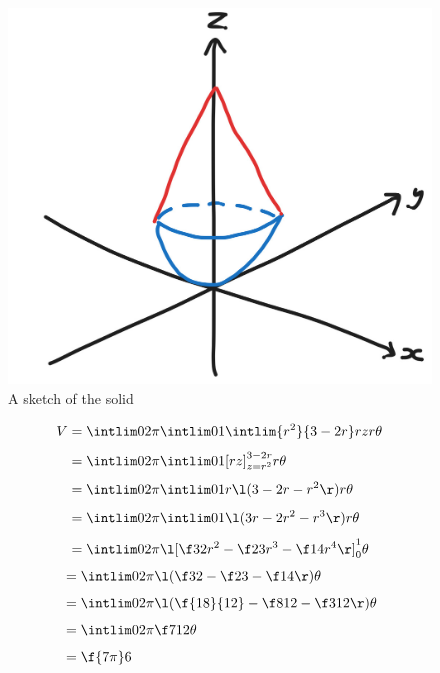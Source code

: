 \documentclass[a4paper]{article}
\begin{document}
\begin{figure}[h]
    \centering
    \includegraphics[scale=0.35]{Q3-sketch}
    \caption{A sketch of the solid}
\end{figure}

\begin{align*}
V &= \intlim 0{2\pi} {\intlim 01 {\intlim {r^2}{3-2r} r z} r} \theta \\[1ex]
&= \intlim 0{2\pi} {\intlim 01 {{[rz]}_{z=r^2}^{3-2r}} r} \theta \\[1ex]
&= \intlim 0{2\pi} {\intlim 01 {r \l( 3 - 2r - r^2 \r)} r} \theta \\[1ex]
&= \intlim 0{2\pi} {\intlim 01 {\l( 3r - 2r^2 - r^3 \r)} r} \theta \\[1ex]
&= \intlim 0{2\pi} {{\l[ \f32 r^2 - \f23 r^3 - \f14 r^4 \r]}_0^1} \theta
\end{align*}
\begin{align*}
&= \intlim 0{2\pi} {\l( \f32 - \f23 - \f14 \r)} \theta \\[1ex]
&= \intlim 0{2\pi} {\l( \f{18}{12} - \f8{12} - \f3{12} \r)} \theta \\[1ex]
&= \intlim 0{2\pi} {\f7{12}} \theta \\[1ex]
&= \f{7\pi}6
\end{align*}

\subsection{~} %
\end{document}
